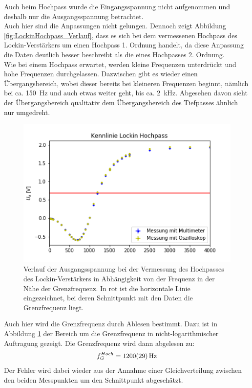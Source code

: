 \documentclass[12pt,a4paper]{article}
\begin{document}
Auch beim Hochpass wurde die Eingangsspannung nicht aufgenommen und deshalb nur die Ausgangsspannung betrachtet. \\
Auch hier sind die Anpassungen nicht gelungen. Dennoch zeigt Abbildung \ref{fig:LockinHochpass_Verlauf}, dass es sich bei dem vermessenen Hochpass des Lockin-Verstärkers um einen Hochpass 1. Ordnung handelt, da diese Anpassung die Daten deutlich besser beschreibt als die eines Hochpasses 2. Ordnung. \\
Wie bei einem Hochpass erwartet, werden kleine Frequenzen unterdrückt und hohe Frequenzen durchgelassen. Dazwischen gibt es wieder einen Übergangsbereich, wobei dieser bereits bei kleineren Frequenzen beginnt, nämlich bei ca. \SI{150}{Hz} und auch etwas weiter geht, bis ca. \SI{2}{kHz}. Abgesehen davon sieht der Übergangsbereich qualitativ dem Übergangsbereich des Tiefpasses ähnlich nur umgedreht.

\begin{figure}
\centering
\includegraphics[scale=1]{Bilder/Vorversuch2/AblesenHochpass.png}
\caption[test]{Verlauf der Ausgangsspannung bei der Vermessung des Hochpasses des Lockin-Verstärkers in Abhängigkeit von der Frequenz in der Nähe der Grenzfrequenz. In rot ist die horizontale Linie eingezeichnet, bei deren Schnittpunkt mit den Daten die Grenzfrequenz liegt.}
\label{fig:LockinHochpass_Ablesen}
\end{figure}

Auch hier wird die Grenzfrequenz durch Ablesen bestimmt. Dazu ist in Abbildung \ref{fig:LockinHochpass_Ablesen} der Bereich um die Grenzfrequenz in nicht-logarithmischer Auftragung gezeigt. Die Grenzfrequenz wird dann abgelesen zu:
\begin{equation*}
f_G^{Hoch} = \SI{1200 \pm 29}{Hz}
\end{equation*}
Der Fehler wird dabei wieder aus der Annahme einer Gleichverteilung zwischen den beiden Messpunkten um den Schnittpunkt abgeschätzt.
\end{document}
